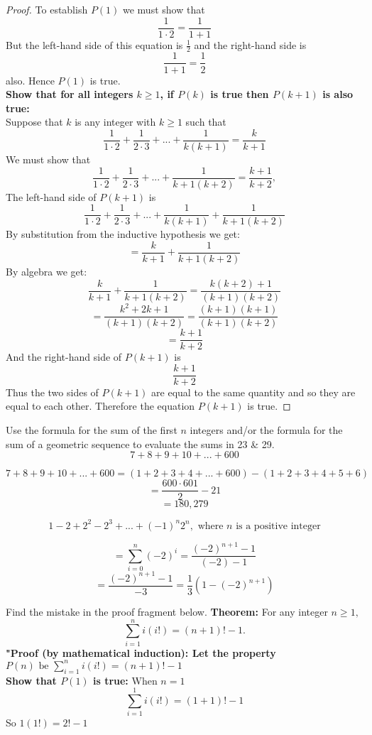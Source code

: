 \documentclass[12pt,letterpaper, onecolumn]{exam}
\begin{document}
\begin{questions}
\begin{solution}
\begin{proof}
				To establish $P(1)$ we must show that
				$$\frac{1}{1\cdot2}=\frac{1}{1+1}$$
				But the left-hand side of this equation is $\frac{1}{2}$ and the right-hand side is
				$$\frac{1}{1+1}=\frac{1}{2}$$
				also. Hence $P(1)$ is true.\\
				\textbf{Show that for all integers $k\geq1$, if $P(k)$ is true then $P(k+1)$ is also true:}\\
				Suppose that $k$ is any integer with $k\geq1$ such that
				$$\frac{1}{1\cdot2}+\frac{1}{2\cdot3}+...+\frac{1}{k(k+1)}=\frac{k}{k+1}$$
				We must show that
				$$\frac{1}{1\cdot2}+\frac{1}{2\cdot3}+...+\frac{1}{k+1(k+2)}=\frac{k+1}{k+2},$$
				The left-hand side of $P(k+1)$ is
				$$\frac{1}{1\cdot2}+\frac{1}{2\cdot3}+...+\frac{1}{k(k+1)}+\frac{1}{k+1(k+2)}$$ 
				By substitution from the inductive hypothesis we get:
				$$=\frac{k}{k+1}+\frac{1}{k+1(k+2)}$$
				By algebra we get:
				$$\frac{k}{k+1}+\frac{1}{k+1(k+2)}=\frac{k(k+2)+1}{(k+1)(k+2)}$$
				$$=\frac{k^2+2k+1}{(k+1)(k+2)}=\frac{(k+1)(k+1)}{(k+1)(k+2)}$$
				$$=\frac{k+1}{k+2}$$
				And the right-hand side of $P(k+1)$ is
				$$\frac{k+1}{k+2}$$
				Thus the two sides of $P(k+1)$ are equal to the same quantity and so they are equal to each other. Therefore the equation $P(k+1)$ is true.
			\end{proof}
		\end{solution}
		Use the formula for the sum of the first $n$ integers and/or the formula for the sum of a geometric sequence to evaluate the sums in 23 \& 29.
		\setcounter{question}{22}\question $$7+8+9+10+...+600$$
		\begin{solution}
			$$7+8+9+10+...+600=(1+2+3+4+...+600)-(1+2+3+4+5+6)$$
			$$=\frac{600\cdot601}{2}-21$$
			$$=180,279$$
		\end{solution}
		\setcounter{question}{28}\question $$1-2+2^2-2^3+...+(-1)^n2^n, \textrm{ where $n$ is a positive integer}$$
		\begin{solution}
			$$=\sum_{i=0}^{n}(-2)^i =\frac{(-2)^{n+1}-1}{(-2)-1}$$
			$$=\frac{(-2)^{n+1}-1}{-3}=\frac{1}{3}(1-(-2)^{n+1})$$
		\end{solution}
		Find the mistake in the proof fragment below.
		\setcounter{question}{34}\question \textbf{Theorem:} For any integer $n\geq1,$
		$$\sum_{i=1}^{n}i(i!)=(n+1)!-1.$$
		\textbf{"Proof (by mathematical induction): Let the property} $P(n) \textrm{ be } \sum_{i=1}^{n}i(i!)=(n+1)!-1$\\
		\textbf{Show that $P(1)$ is true:} When $n=1$
		$$\sum_{i=1}^{1}i(i!)=(1+1)!-1$$
		So $1(1!)=2!-1$\\

\end{questions}
\end{document}
